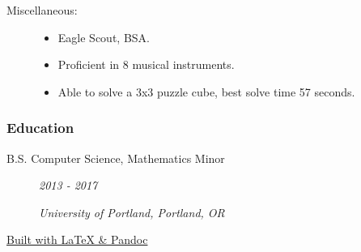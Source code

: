 \documentclass{article}
\begin{document}
\begin{description}
            \vspace{0.5em}

        \item[Miscellaneous:] \hfill
            \begin{itemize}
                \item Eagle Scout, BSA.
                \item Proficient in 8 musical instruments.
                \item Able to solve a 3x3 puzzle cube, best solve time 57 seconds.
        \end{itemize}
    \end{description}
    
\subsubsection*{Education}
    \begin{description}
        \item[B.S. Computer Science, Mathematics Minor]\hfill \textit{2013 - 2017}

        \textit{University of Portland, Portland, OR}


    \end{description}
    
    \begin{center}
	\vspace{.25in}
    \href{https://www.github.com/BurnsCommaLucas/Resume}{\small Built with \LaTeX \hspace{0.001in} \& Pandoc}
    \end{center}
\end{document}

